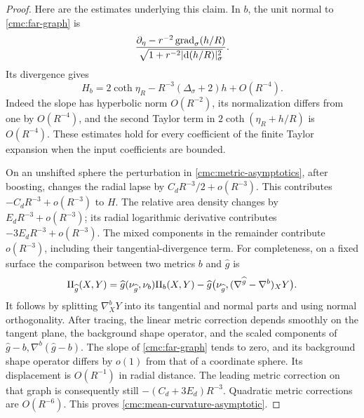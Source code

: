 \begin{proof}
Here are the estimates underlying this claim.
In \(b\), the unit normal to \eqref{cmc:far-graph} is
\[
 \frac{\partial_\eta-r^{-2}\operatorname{grad}_\sigma(h/R)}
 {\sqrt{1+r^{-2}|\mathrm{d}(h/R)|_\sigma^2}}.
\]
Its divergence gives
\[
 H_b=2\coth\eta_R
       -R^{-3}(\Delta_\sigma+2)h+O(R^{-4}).
\]
Indeed the slope has hyperbolic norm \(O(R^{-2})\), its normalization
differs from one by \(O(R^{-4})\), and the second Taylor term in
\(2\coth(\eta_R+h/R)\) is \(O(R^{-4})\).
These estimates hold for every coefficient of the finite Taylor
expansion when the input coefficients are bounded.

On an unshifted sphere the perturbation in
\eqref{cmc:metric-asymptotics}, after boosting, changes the radial
lapse by \(C_dR^{-3}/2+o(R^{-3})\).  This contributes
\(-C_dR^{-3}+o(R^{-3})\) to \(H\).
The relative area density changes by \(E_dR^{-3}+o(R^{-3})\);
its radial logarithmic derivative contributes
\(-3E_dR^{-3}+o(R^{-3})\).
The mixed components in the remainder contribute \(o(R^{-3})\),
including their tangential-divergence term.
For completeness, on a fixed surface the comparison between two
metrics \(b\) and \(\widehat g\) is
\[
 \mathrm{II}_{\widehat g}(X,Y)
 =\widehat g(\nu_{\widehat g},\nu_b)\mathrm{II}_b(X,Y)
 -\widehat g\bigl(\nu_{\widehat g},
       (\nabla^{\widehat g}-\nabla^b)_XY\bigr).
\]
It follows by splitting \(\nabla_X^bY\) into its tangential and normal
parts and using normal orthogonality.
After tracing, the linear metric correction depends smoothly on
the tangent plane, the background shape operator, and the scaled
components of \(\widehat g-b,\nabla^b(\widehat g-b)\).
The slope of \eqref{cmc:far-graph} tends to zero, and its background
shape operator differs by \(o(1)\) from that of a coordinate sphere.
Its displacement is \(O(R^{-1})\) in radial distance.
The leading metric correction on that graph is consequently still
\(-(C_d+3E_d)R^{-3}\).
Quadratic metric corrections are \(O(R^{-6})\).
This proves \eqref{cmc:mean-curvature-asymptotic}.


\end{proof}
